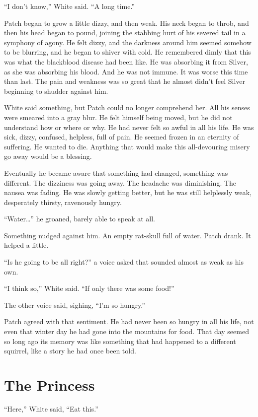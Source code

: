 \documentclass[ebook,oneside,openany,12pt]{memoir}
\begin{document}
“I don’t know,” White said. “A long time.”

Patch began to grow a little dizzy, and then weak. His neck began to
throb, and then his head began to pound, joining the stabbing hurt of
his severed tail in a symphony of agony. He felt dizzy, and the
darkness around him seemed somehow to be blurring, and he began to
shiver with cold. He remembered dimly that this was what the
blackblood disease had been like. He was absorbing it from Silver, as
she was absorbing his blood. And he was not immune. It was worse this
time than last. The pain and weakness was so great that he almost
didn’t feel Silver beginning to shudder against him.

White said something, but Patch could no longer comprehend her. All
his senses were smeared into a gray blur. He felt himself being moved,
but he did not understand how or where or why. He had never felt so
awful in all his life. He was sick, dizzy, confused, helpless, full of
pain. He seemed frozen in an eternity of suffering. He wanted to
die. Anything that would make this all-devouring misery go away would
be a blessing.

Eventually he became aware that something had changed, something was
different. The dizziness was going away. The headache was
diminishing. The nausea was fading. He was slowly getting better, but
he was still helplessly weak, desperately thirsty, ravenously hungry.

“Water…” he groaned, barely able to speak at all.

Something nudged against him. An empty rat-skull full of water. Patch
drank. It helped a little.

“Is he going to be all right?” a voice asked that sounded almost as
weak as his own.

“I think so,” White said. “If only there was some food!”

The other voice said, sighing, “I’m so hungry.”

Patch agreed with that sentiment. He had never been so hungry in all
his life, not even that winter day he had gone into the mountains for
food. That day seemed so long ago its memory was like something that
had happened to a different squirrel, like a story he had once been
told.


\section{The Princess}

“Here,” White said, “Eat this.”
\end{document}
